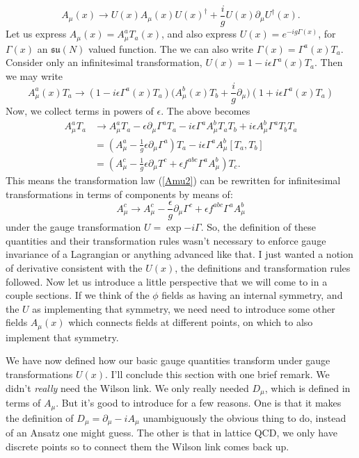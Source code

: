 \documentclass[main.tex]{subfiles}
\begin{document}
\begin{equation} \label{Amu2}
\boxed{A_\mu (x) \to U (x) A_\mu (x) U(x)^\dagger + \frac{i}{g} U(x) \partial_\mu U^\dagger (x).}
\end{equation}
Let us express $A_\mu (x) = A_\mu^a T_a (x)$, and also express $U(x) = e^{- i g \Gamma(x)}$, for $\Gamma(x)$ an $\mathfrak{su}(N)$ valued function. The we can also write $\Gamma(x) = \Gamma^a(x) T_a$. Consider only an infinitesimal transformation, $U(x) = 1 - i \epsilon \Gamma^a (x) T_a$. Then we may write
\[
A_\mu^a (x) T_a \to 
(1 - i \epsilon \Gamma^a (x) T_a) \Big(
A_\mu^b (x) T_b + \frac{i}{g} \partial_\mu
\Big)
(1 + i \epsilon \Gamma^a (x) T_a)
\]
Now, we collect terms in powers of $\epsilon$. The above becomes
\begin{align*}
A_\mu^a T_a & \to A_\mu^a T_a - \epsilon \partial_\mu \Gamma^a T_a 
-i \epsilon \Gamma^a A_\mu^b T_a T_b 
+i \epsilon A_\mu^b \Gamma^a T_b T_a \\ & = 
(A_\mu^a - \frac{1}{g}\epsilon \partial_\mu \Gamma^a) T_a - i \epsilon \Gamma^a A_\mu^b [T_a,T_b]
\\ & = 
(A_\mu^c - \frac{1}{g} \epsilon \partial_\mu T^c + \epsilon f^{abc} \Gamma^a A_\mu^b)T_c.
\end{align*}
This means the transformation law (\ref{Amu2}) can be rewritten for infinitesimal transformations in terms of components by means of:
\begin{equation} \label{Amua}
\boxed{A_\mu^c \to A_\mu^c - \frac{\epsilon}{g} \partial_\mu \Gamma^c + \epsilon f^{abc} \Gamma^a A_\mu^b}
\end{equation}
under the gauge transformation $U = \exp{-i \Gamma}$.
So, the definition of these quantities and their transformation rules wasn't necessary to enforce gauge invariance of a Lagrangian or anything advanced like that. I just wanted a notion of derivative consistent with the $U(x)$, the definitions and transformation rules followed. Now let us introduce a little perspective that we will come to in a couple sections. If we think of the $\phi$ fields as having an internal symmetry, and the $U$ as implementing that symmetry, we need need to introduce some other fields $A_\mu (x)$ which connects fields at different points, on which to also implement that symmetry. 

We have now defined how our basic gauge quantities transform under gauge transformations $U(x)$. I'll conclude this section with one brief remark. We didn't \textit{really} need the Wilson link. We only really needed $D_\mu$, which is defined in terms of $A_\mu$. But it's good to introduce for a few reasons. One is that it makes the definition of $D_\mu = \partial_\mu - iA_\mu$ unambiguously the obvious thing to do, instead of an Ansatz one might guess. The other is that in lattice QCD, we only have discrete points so to connect them the Wilson link comes back up.
\end{document}
